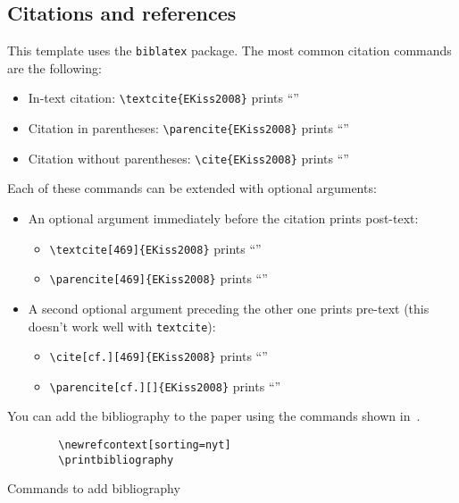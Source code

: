 \subsection{Citations and references}\label{sec:bibliography}

This template uses the \texttt{biblatex} package. The most common citation
commands are the following:

\begin{itemize}
    \item In-text citation: \verb+\textcite{EKiss2008}+ prints \enquote{\textcite{EKiss2008}}
    \item Citation in parentheses: \verb+\parencite{EKiss2008}+ prints \enquote{\parencite{EKiss2008}}
    \item Citation without parentheses: \verb+\cite{EKiss2008}+ prints \enquote{\cite{EKiss2008}}
\end{itemize}

Each of these commands can be extended with optional arguments:

\begin{itemize}
    \item An optional argument immediately before the citation prints post-text:
    \begin{itemize}
        \item \verb+\textcite[469]{EKiss2008}+ prints \enquote{\textcite[469]{EKiss2008}}
        \item \verb+\parencite[469]{EKiss2008}+ prints \enquote{\parencite[469]{EKiss2008}}
    \end{itemize}
    \item A second optional argument preceding the other one prints pre-text (this doesn't work well with \verb+textcite+):
    \begin{itemize}
        \item \verb+\cite[cf.][469]{EKiss2008}+ prints \enquote{\cite[cf.][469]{EKiss2008}}
        \item \verb+\parencite[cf.][]{EKiss2008}+ prints \enquote{\parencite[cf.][]{EKiss2008}}
    \end{itemize}
\end{itemize}

You can add the bibliography to the paper using the commands shown
in~.

\begin{listing}[h!t]
    \begin{verbatim}
        \newrefcontext[sorting=nyt]
        \printbibliography
    \end{verbatim}
    \caption{Commands to add bibliography}\label{lst:bibliography}
\end{listing}

